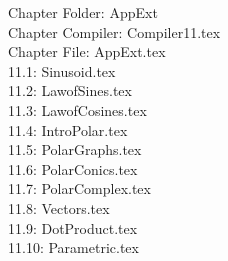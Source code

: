 \documentclass[11pt]{book}
\theoremstyle{definition}  %
\begin{document}
\begin{multicols}{2}
Chapter Folder:  AppExt \\

Chapter Compiler:  Compiler11.tex \\

Chapter File:  AppExt.tex \\

11.1:  Sinusoid.tex \\

11.2:  LawofSines.tex \\

11.3:  LawofCosines.tex \\

11.4:  IntroPolar.tex \\

11.5:  PolarGraphs.tex \\

11.6:  PolarConics.tex \\

11.7:  PolarComplex.tex \\

11.8:  Vectors.tex \\

11.9:  DotProduct.tex \\

11.10:  Parametric.tex \\

\end{multicols}
\end{document}
